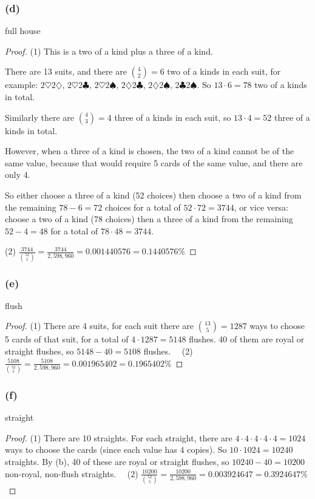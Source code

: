 \documentclass[14pt]{extarticle}
\begin{document}
\subsubsection{(d)}
full house

\begin{proof}
(1) This is a two of a kind plus a three of a kind. 

There are 13 suits, and there are \(\binom{4}{2} = 6\) two of a kinds in each suit, for example: 
\(2\heartsuit 2\diamondsuit\), \(2\heartsuit 2\clubsuit\), \(2\heartsuit 2\spadesuit\), \(2\diamondsuit 2\clubsuit\), 
\(2\diamondsuit 2\spadesuit\), \(2\clubsuit 2\spadesuit\). So \(13 \cdot 6 = 78\) two of a kinds in total.

Similarly there are \(\binom{4}{3} = 4\) three of a kinds in each suit, so \(13 \cdot 4 = 52\) three of a kinds in total.

However, when a three of a kind is chosen, the two of a kind cannot be of the same value, because that would require 5 
cards of the same value, and there are only 4.

So either choose a three of a kind (52 choices) then choose a two of a kind from the remaining \(78-6=72\) choices for a
total of \(52 \cdot 72 = 3744\), or vice versa: choose a two of a kind (78 choices) then a three of a kind from the 
remaining \(52-4=48\) for a total of \(78 \cdot 48 = 3744\).

(2) \(\frac{3744}{\binom{52}{5}} = \frac{3744}{2,598,960} = 0.001440576 = 0.1440576\%\)
\end{proof}

\subsubsection{(e)}
flush

\begin{proof}
(1) There are 4 suits, for each suit there are \(\binom{13}{5} = 1287\) ways to choose 5 cards of that suit, for a total of
\(4 \cdot 1287 = 5148\) flushes. 40 of them are royal or straight flushes, so \(5148-40 = 5108\) flushes. \,\,\,\,
(2) \(\frac{5108}{\binom{52}{5}} = \frac{5108}{2,598,960} = 0.001965402 = 0.1965402\%\)
\end{proof}

\subsubsection{(f)}
straight

\begin{proof}
(1) There are 10 straights. For each straight, there are \(4 \cdot 4 \cdot 4 \cdot 4 \cdot 4 = 1024\) ways to choose the
cards (since each value has 4 copies). So \(10 \cdot 1024 = 10240\) straights. By (b), 40 of these are royal or straight 
flushes, so \(10240-40 = 10200\) non-royal, non-flush straights. \,\,\,\,
(2) \(\frac{10200}{\binom{52}{5}} = \frac{10200}{2,598,960} = 0.003924647 = 0.3924647\%\)
\end{proof}
\end{document}
